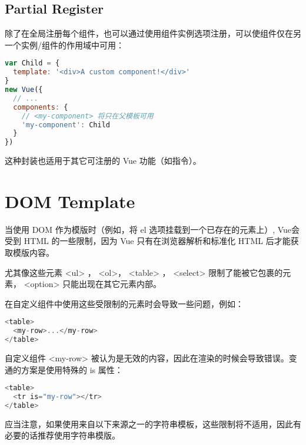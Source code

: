 \begin{lstlisting}[language=JavaScript]

\end{lstlisting}




\begin{lstlisting}[language=JavaScript]

\end{lstlisting}



\subsection{Partial Register}

除了在全局注册每个组件，也可以通过使用组件实例选项注册，可以使组件仅在另一个实例/组件的作用域中可用：


\begin{lstlisting}[language=JavaScript]
var Child = {
  template: '<div>A custom component!</div>'
}
new Vue({
  // ...
  components: {
    // <my-component> 将只在父模板可用
    'my-component': Child
  }
})
\end{lstlisting}

这种封装也适用于其它可注册的 Vue 功能（如指令）。


\section{DOM Template}


当使用 DOM 作为模版时（例如，将 el 选项挂载到一个已存在的元素上）, Vue会受到 HTML 的一些限制，因为 Vue 只有在浏览器解析和标准化 HTML 后才能获取模版内容。

尤其像这些元素 <ul> ， <ol>， <table> ， <select> 限制了能被它包裹的元素， <option> 只能出现在其它元素内部。


在自定义组件中使用这些受限制的元素时会导致一些问题，例如：

\begin{lstlisting}[language=JavaScript]
<table>
  <my-row>...</my-row>
</table>
\end{lstlisting}

自定义组件 <my-row> 被认为是无效的内容，因此在渲染的时候会导致错误。变通的方案是使用特殊的 is 属性：

\begin{lstlisting}[language=JavaScript]
<table>
  <tr is="my-row"></tr>
</table>
\end{lstlisting}

应当注意，如果使用来自以下来源之一的字符串模板，这些限制将不适用，因此有必要的话推荐使用字符串模版。

